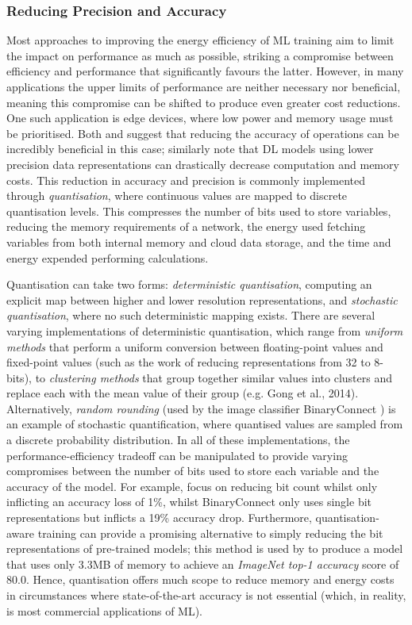 \documentclass[a4paper, 12pt]{article}
\begin{document}
    \subsubsection{Reducing Precision and Accuracy}

    Most approaches to improving the energy efficiency of ML training aim to limit the impact on performance as much as possible, striking a compromise between efficiency and performance that significantly favours the latter. However, in many applications the upper limits of performance are neither necessary nor beneficial, meaning this compromise can be shifted to produce even greater cost reductions. One such application is edge devices, where low power and memory usage must be prioritised. Both \citet{kumar-2020} and \citet{xu-2021} suggest that reducing the accuracy of operations can be incredibly beneficial in this case; \citet{sze-2017} similarly note that DL models using lower precision data representations can drastically decrease computation and memory costs. This reduction in accuracy and precision is commonly implemented through \emph{quantisation}, where continuous values are mapped to discrete quantisation levels. This compresses the number of bits used to store variables, reducing the memory requirements of a network, the energy used fetching variables from both internal memory and cloud data storage, and the time and energy expended performing calculations. 

    Quantisation can take two forms: \emph{deterministic quantisation}, computing an explicit map between higher and lower resolution representations, and \emph{stochastic quantisation}, where no such deterministic mapping exists. There are several varying implementations of deterministic quantisation, which range from \emph{uniform methods} that perform a uniform conversion between floating-point values and fixed-point values (such as the work of \citet{shou-2016} reducing representations from 32 to 8-bits), to \emph{clustering methods} that group together similar values into clusters and replace each with the mean value of their group (e.g. Gong et al., 2014). Alternatively, \emph{random rounding} (used by the image classifier BinaryConnect \citep{courbariaux-2015}) is an example of stochastic quantification, where quantised values are sampled from a discrete probability distribution. In all of these implementations, the performance-efficiency tradeoff can be manipulated to provide varying compromises between the number of bits used to store each variable and the accuracy of the model. For example, \citet{judd-2016} focus on reducing bit count whilst only inflicting an accuracy loss of 1\%, whilst BinaryConnect only uses single bit representations but inflicts a 19\% accuracy drop. Furthermore, quantisation-aware training can provide a promising alternative to simply reducing the bit representations of pre-trained models; this method is used by \citet{fan-2020b} to produce a model that uses only 3.3MB of memory to achieve an \emph{ImageNet top-1 accuracy} score of 80.0. Hence, quantisation offers much scope to reduce memory and energy costs in circumstances where state-of-the-art accuracy is not essential (which, in reality, is most commercial applications of ML).
\end{document}
